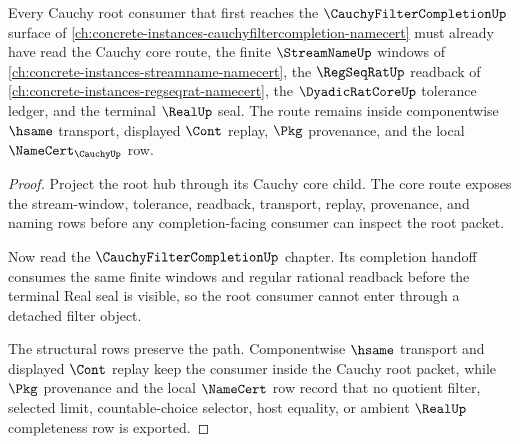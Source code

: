 \begin{theorem}
\label{thm:cauchy-filter-completion-cauchy-anchor}
Every Cauchy root consumer that first reaches the $\CauchyFilterCompletionUp$ surface of \autoref{ch:concrete-instances-cauchyfiltercompletion-namecert} must already have read the Cauchy core route, the finite $\StreamNameUp$ windows of \autoref{ch:concrete-instances-streamname-namecert}, the $\RegSeqRatUp$ readback of \autoref{ch:concrete-instances-regseqrat-namecert}, the $\DyadicRatCoreUp$ tolerance ledger, and the terminal $\RealUp$ seal. The route remains inside componentwise $\hsame$ transport, displayed $\Cont$ replay, $\Pkg$ provenance, and the local $\NameCert_{\CauchyUp}$ row.
\end{theorem}
\begin{proof}
Project the root hub through its Cauchy core child. The core route exposes the stream-window, tolerance, readback, transport, replay, provenance, and naming rows before any completion-facing consumer can inspect the root packet.

Now read the $\CauchyFilterCompletionUp$ chapter. Its completion handoff consumes the same finite windows and regular rational readback before the terminal Real seal is visible, so the root consumer cannot enter through a detached filter object.

The structural rows preserve the path. Componentwise $\hsame$ transport and displayed $\Cont$ replay keep the consumer inside the Cauchy root packet, while $\Pkg$ provenance and the local $\NameCert$ row record that no quotient filter, selected limit, countable-choice selector, host equality, or ambient $\RealUp$ completeness row is exported.
\end{proof}
